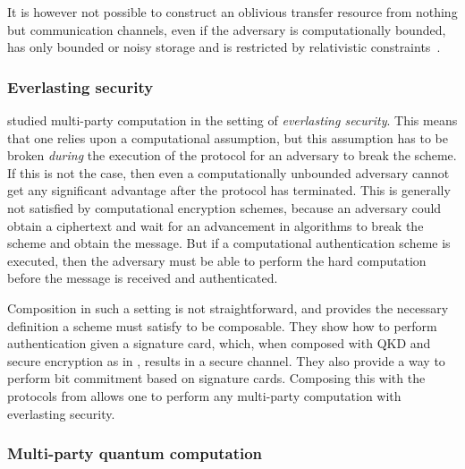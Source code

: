 It is however not possible to construct an oblivious transfer resource
from nothing but communication channels, even if the adversary is
computationally bounded, has only bounded or noisy storage and is
restricted by relativistic constraints~\cite{LdR21}.

\subsubsection{Everlasting security}
\label{sec:mpc.ever}

\textcite{Unr13} studied multi-party computation in the setting of
\emph{everlasting security}. This means that one relies upon a
computational assumption, but this assumption has to be broken
\emph{during} the execution of the protocol for an adversary to break
the scheme. If this is not the case, then even a computationally
unbounded adversary cannot get any significant advantage after the
protocol has terminated. This is generally not satisfied by
computational encryption schemes, because an adversary could obtain a
ciphertext and wait for an advancement in algorithms to break the
scheme and obtain the message. But if a computational authentication
scheme is executed, then the adversary must be able to perform the
hard computation before the message is received and authenticated.

Composition in such a setting is not straightforward, and
\textcite{Unr13} provides the necessary definition a scheme must
satisfy to be composable. They show how to perform
authentication given a signature card, which, when composed with QKD
and secure encryption as in , results in a secure
channel. They also provide a way to perform bit commitment based on signature
cards. Composing this with the protocols from 
allows one to perform any multi-party computation with everlasting
security.

\subsubsection{Multi-party quantum computation}
\label{sec:mpc.MPQC}


